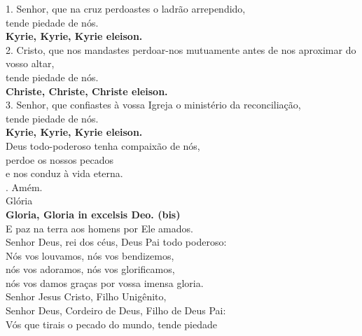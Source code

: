 \documentclass{book}
\begin{document}
\begin{flushleft}
    1. Senhor, que na cruz perdoastes o ladrão arrependido, \\
    tende piedade de nós.
    \vspace{.2cm} \\
    \textbf{Kyrie, Kyrie, Kyrie eleison.}
    \vspace{.2cm} \\
    2. Cristo, que nos mandastes perdoar-nos mutuamente antes de nos aproximar do vosso altar, \\
    tende piedade de nós.
    \vspace{.2cm} \\
    \textbf{Christe, Christe, Christe eleison.}
    \vspace{.2cm} \\
    3. Senhor, que confiastes à vossa Igreja o ministério da reconciliação, \\
    tende piedade de nós.
    \vspace{.2cm} \\
    \textbf{Kyrie, Kyrie, Kyrie eleison.}
    \vspace{.2cm} \\
    Deus todo-poderoso tenha compaixão de nós, \\
    perdoe os nossos pecados \\
    e nos conduz à vida eterna. \\
    {\color{VioletRed2} \Rbar.} Amém.
    \vspace{.2cm} \\
    \textcolor{VioletRed2}{Glória}
    \vspace{.2cm} \\
    \textbf{Gloria, Gloria in excelsis Deo. (bis)}
    \vspace{.2cm} \\
    E paz na terra aos homens por Ele amados. \\
    Senhor Deus, rei dos céus, Deus Pai todo poderoso: \\
    Nós vos louvamos, nós vos bendizemos, \\
    nós vos adoramos, nós vos glorificamos, \\
    nós vos damos graças por vossa imensa gloria.
    \vspace{.2cm} \\
    Senhor Jesus Cristo, Filho Unigênito, \\
    Senhor Deus, Cordeiro de Deus, Filho de Deus Pai: \\
    Vós que tirais o pecado do mundo, tende piedade \\

\end{flushleft}
\end{document}
